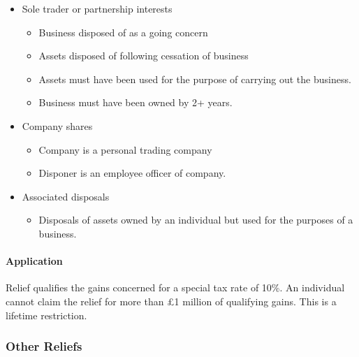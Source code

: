 \documentclass[
]{article}
\providecommand{\tightlist}{%
  \setlength{\itemsep}{0pt}\setlength{\parskip}{0pt}}
\begin{document}
\begin{itemize}
\tightlist
\item
  Sole trader or partnership interests

  \begin{itemize}
  \tightlist
  \item
    Business disposed of as a going concern
  \item
    Assets disposed of following cessation of business
  \item
    Assets must have been used for the purpose of carrying out the
    business.
  \item
    Business must have been owned by 2+ years.
  \end{itemize}
\item
  Company shares

  \begin{itemize}
  \tightlist
  \item
    Company is a personal trading company
  \item
    Disponer is an employee officer of company.
  \end{itemize}
\item
  Associated disposals

  \begin{itemize}
  \tightlist
  \item
    Disposals of assets owned by an individual but used for the purposes
    of a business.
  \end{itemize}
\end{itemize}

\hypertarget{application-2}{%
\paragraph{Application}\label{application-2}}

Relief qualifies the gains concerned for a special tax rate of 10\%. An
individual cannot claim the relief for more than £1 million of
qualifying gains. This is a lifetime restriction.

\hypertarget{other-reliefs}{%
\subsubsection{Other Reliefs}\label{other-reliefs}}
\end{document}
